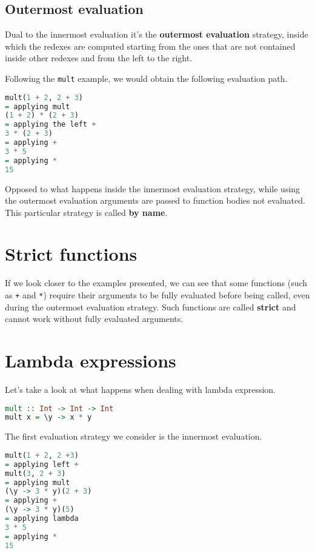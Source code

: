 \subsection{Outermost evaluation}
Dual to the innermost evaluation it's the \textbf{outermost evaluation} strategy, inside which the redexes are computed starting from the ones that are not contained inside other redexes and from the left to the right.
\linebreak \linebreak

Following the \texttt{mult} example, we would obtain the following evaluation path. 

\begin{lstlisting}[language=haskell]
mult(1 + 2, 2 + 3)
= applying mult
(1 + 2) * (2 + 3)
= applying the left +
3 * (2 + 3)
= applying +
3 * 5
= applying *
15
\end{lstlisting}

Opposed to what happens inside the innermost evaluation strategy, while using the outermost evaluation arguments are passed to function bodies not evaluated. This particular strategy is called \textbf{by name}. 

\section{Strict functions}
If we look closer to the examples presented, we can see that some functions (such as \texttt{+} and \texttt{*}) require their arguments to be fully evaluated before being called, even during the outermost evaluation strategy. Such functions are called \textbf{strict} and cannot work without fully evaluated arguments.

\section{Lambda expressions}
Let's take a look at what happens when dealing with lambda expression. \\

\begin{lstlisting}[language=haskell]
mult :: Int -> Int -> Int
mult x = \y -> x * y 
\end{lstlisting}

The first evaluation strategy we consider is the innermost evaluation.

\begin{lstlisting}[language=haskell]
mult(1 + 2, 2 +3)
= applying left +
mult(3, 2 + 3)
= applying mult
(\y -> 3 * y)(2 + 3)
= applying +
(\y -> 3 * y)(5)
= applying lambda
3 * 5
= applying *
15
\end{lstlisting}

